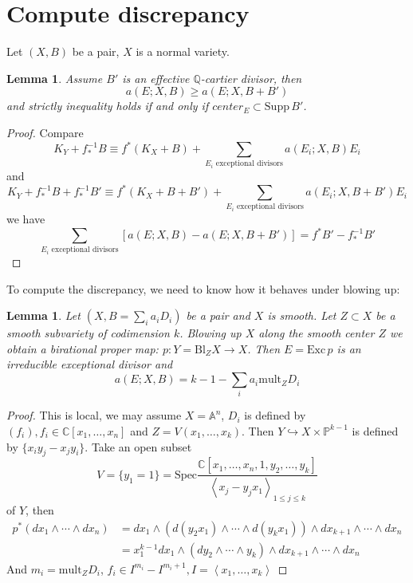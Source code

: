 \documentclass{article}
\newtheorem{lem}[defn]{Lemma}
\begin{document}
\section{Compute discrepancy}
Let $ (X,B) $ be a pair, $ X $ is a normal variety.
\begin{lem}
	Assume $ B' $ is an effective $ \mathbb{Q} $-cartier divisor, then $$ a(E;X,B)\geqslant a(E;X,B+B') $$
	and strictly inequality holds if and only if $ center_E\subset \mathrm{Supp}\, B' $.
\end{lem}
\begin{proof}
	Compare
	$$ K_Y+f^{-1}_*B\equiv f^*(K_X+B)+\sum_{E_i\text{ exceptional divisors}}a(E_i;X,B)E_i $$
	and
	$$ K_Y+f^{-1}_*B+f^{-1}_*B'\equiv f^*(K_X+B+B')+\sum_{E_i\text{ exceptional divisors}}a(E_i;X,B+B')E_i $$
	we have
	$$ \sum_{E_i\text{ exceptional divisors}}[a(E;X,B)- a(E;X,B+B')]=f^*B'-f^{-1}_*B' $$
\end{proof}
 To compute the discrepancy, we need to know how it behaves under blowing up:
 \begin{lem}
 	Let $ (X,B=\sum_ia_iD_i) $ be a pair and $ X $ is smooth. Let $ Z\subset X $ be a smooth subvariety of codimension $ k $. Blowing up  $ X $ along the smooth center $ Z $ we obtain a birational proper map: $ p:Y=\mathrm{Bl}_ZX\to X $. Then $ E=\mathrm{Exc}\, p $ is an irreducible exceptional divisor and
 	$$ a(E;X,B)=k-1-\sum_ia_i\mathrm{mult}_ZD_i $$
 \end{lem}
\begin{proof}
	This is local, we may assume $ X=\mathbb{A}^n $, $ D_i $ is defined by $ (f_i),f_i\in \mathbb{C}[x_1,\ldots,x_n] $ and $ Z=V(x_1,\ldots,x_{k}) $. Then $ Y\hookrightarrow X\times \mathbb{P}^{k-1} $ is defined by $ \{ x_iy_j-x_jy_i\} $. Take an open subset 
	$$ V=\{ y_1=1 \} =\mathrm{Spec}\frac{\mathbb{C}[x_1,\ldots,x_n,1,y_2,\ldots,y_k]}{\left <x_j-y_jx_1 \right >_{1\leqslant j\leqslant k}}$$
	 of $ Y $, then 
	 \begin{equation*}
	 	\begin{aligned}
	 	 p^*(dx_1\wedge\cdots\wedge dx_n)&=dx_1\wedge (d(y_2x_1)\wedge\cdots\wedge d(y_kx_1))\wedge dx_{k+1}\wedge\cdots\wedge dx_n\\
	 	 &=x_1^{k-1}dx_1\wedge (dy_2\wedge\cdots\wedge y_k)\wedge dx_{k+1}\wedge\cdots\wedge dx_n 
	 	\end{aligned}
	 \end{equation*}
	 And $ m_i=\mathrm{mult}_ZD_i $, $ f_i\in I^{m_i}-I^{m_i+1}, I=\left <x_1,\ldots,x_k\right > $
\end{proof}
\end{document}
